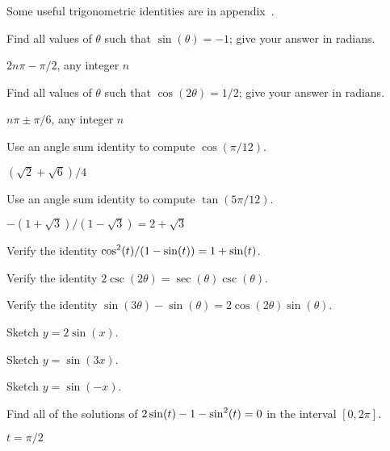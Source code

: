 \begin{exercises} Some useful trigonometric identities are in
appendix~.

\exercise Find all values of $\theta$ such that
$\sin(\theta) = -1$; give your answer in radians.
\begin{answer} $2n\pi-\pi/2$, any integer $n$
\end{answer}

\exercise Find all values of $\theta$ such that
$\cos(2\theta) = 1/2$; give your answer in radians.
\begin{answer} $n\pi\pm\pi/6$, any integer $n$
\end{answer}

\exercise Use an angle sum identity to compute
  $\cos(\pi/12)$.
\begin{answer} $(\sqrt2+\sqrt6)/4$
\end{answer}

\exercise Use an angle sum identity to compute
  $\tan(5\pi/12)$.
\begin{answer} $-(1+\sqrt3)/(1-\sqrt3)=2+\sqrt3$
\end{answer}

\exercise Verify the identity $\displaystyle \cos^2(t)/(1-\sin(t)) =
  1+\sin(t)$.

\exercise Verify the identity $2\csc(2\theta)=\sec(\theta)\csc(\theta)$.

\exercise Verify the identity $\sin(3\theta) - \sin(\theta) = 2\cos(2\theta)
  \sin(\theta)$.

\exercise Sketch $y=2\sin(x)$.

\exercise Sketch $y=\sin(3x)$.

\exercise Sketch $y=\sin(-x)$.

\exercise Find all of the solutions of $\displaystyle 2\sin(t) -1 -\sin^2(t) =0$ in the
 interval $[0,2\pi]$.
\begin{answer} $t=\pi/2$
\end{answer}

\end{exercises}
